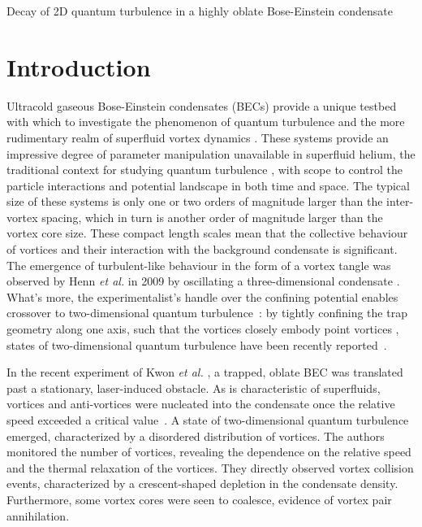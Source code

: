 \begin{chapter}{\label{cha:shin}Decay of 2D quantum turbulence in a highly oblate Bose-Einstein condensate}
\newcommand{\gws}[1]{\textcolor{blue}{#1}}
\newcommand{\ngp}[1]{#1}%
\newcommand{\etal}{{\it et al.}~}
\newcommand{\etalcc}{{\it et al.}}
\newcommand{\boldell}{{\mbox{\boldmath $\ell$}}}
\newcommand{\intr}{\int d \mathbf{r}}
\newcommand{\bfrt}{({\bf{r}},t)}
\newcommand{\fprt}{f({\mathbf{p}}, {\mathbf{r}},t)}

\section{Introduction}
Ultracold gaseous Bose-Einstein condensates (BECs) provide a unique testbed with which to investigate the phenomenon of quantum turbulence and the more rudimentary realm of superfluid vortex dynamics \citep{white_anderson_14,barenghi_skrbek_14}.  These systems provide an impressive degree of parameter manipulation unavailable in superfluid helium, the traditional context for studying quantum turbulence \citep{barenghi_donnelly_01}, with scope to control the particle interactions and potential landscape in both time and space.  The typical size of these systems is only one or two orders of magnitude larger than the inter-vortex spacing, which in turn is another order of magnitude larger than the vortex core size.  These compact length scales mean that the collective behaviour of vortices and their interaction with the background condensate is significant.  The emergence of turbulent-like behaviour in the form of a vortex tangle was observed by Henn {\it et al.} in 2009 by oscillating a three-dimensional condensate \cite{Henn}.  What's more, the experimentalist's handle over the confining potential enables crossover to two-dimensional quantum turbulence~\cite{parker2005}: by tightly confining the trap geometry along one axis, such that the vortices closely embody point vortices \cite{middelkamp}, states of two-dimensional quantum turbulence have been recently reported~\citep{neely_bradley_13,kwon_moon_14}.

In the recent experiment of Kwon {\it et al.} \citep{kwon_moon_14}, a trapped, oblate BEC was translated past a stationary, laser-induced obstacle.  As is characteristic of superfluids, vortices and anti-vortices were nucleated into the condensate once the relative speed exceeded a critical value~\cite{frisch92}.  \ngp{A state of two-dimensional quantum turbulence emerged, characterized by a disordered distribution of vortices.}  The authors monitored the number of vortices, revealing the dependence on the relative speed and the thermal relaxation of the vortices.  They directly observed vortex collision events, characterized by a crescent-shaped depletion in the condensate density. Furthermore, some vortex cores were seen to coalesce, evidence of vortex pair annihilation.


\end{chapter}
